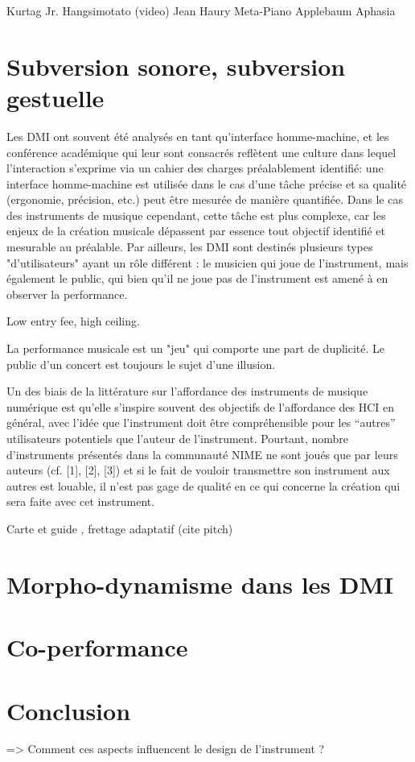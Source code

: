 Kurtag Jr. Hangsimotato (video)
Jean Haury Meta-Piano
Applebaum Aphasia

\section{Subversion sonore, subversion gestuelle}

Les DMI ont souvent été analysés en tant qu'interface homme-machine, et les conférence académique qui leur sont consacrés reflètent une culture dans lequel l'interaction s'exprime via un cahier des charges préalablement identifié: une interface homme-machine est utilisée dans le cas d'une tâche précise et sa qualité (ergonomie, précision, etc.) peut être mesurée de manière quantifiée.
Dans le cas des instruments de musique cependant, cette tâche est plus complexe, car les enjeux de la création musicale dépassent par essence tout objectif identifié et mesurable au préalable. Par ailleurs, les DMI sont destinés plusieurs types "d'utilisateurs" ayant un rôle différent : le musicien qui joue de l'instrument, mais également le public, qui bien qu'il ne joue pas de l'instrument est amené à en observer la performance.

Low entry fee, high ceiling.

La performance musicale est un "jeu" qui comporte une part de duplicité. Le public d'un concert est toujours le sujet d'une illusion. 

Un des biais de la littérature sur l’affordance des instruments de musique numérique est qu’elle s’inspire souvent des objectifs de l’affordance des HCI en général, avec l’idée que l’instrument doit être compréhensible pour les “autres” utilisateurs potentiels que l’auteur de l’instrument. Pourtant, nombre d’instruments présentés dans la communauté NIME ne sont joués que par leurs auteurs (cf. [1], [2], [3]) et si le fait de vouloir transmettre son instrument aux autres est louable, il n’est pas gage de qualité en ce qui concerne la création qui sera faite avec cet instrument.     

\cite{bin_show_2018}

Carte et guide , frettage adaptatif (cite pitch)

\section{Morpho-dynamisme dans les DMI}

\section{Co-performance}


\section{Conclusion}
\label{sec:transparency:conclusion}
=> Comment ces aspects influencent le design de l’instrument ?


